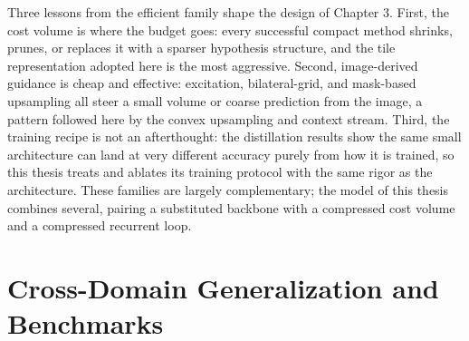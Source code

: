 Three lessons from the efficient family shape the design of Chapter 3.
First, the cost volume is where the budget goes: every successful
compact method shrinks, prunes, or replaces it with a sparser hypothesis
structure, and the tile representation adopted here is the most
aggressive. Second, image-derived guidance is cheap and effective:
excitation, bilateral-grid, and mask-based upsampling all steer a small
volume or coarse prediction from the image, a pattern followed here by
the convex upsampling and context stream. Third, the training recipe is
not an afterthought: the distillation results show the same small
architecture can land at very different accuracy purely from how it is
trained, so this thesis treats and ablates its training protocol with
the same rigor as the architecture. These families are largely
complementary; the model of this thesis combines several, pairing a
substituted backbone with a compressed cost volume and a compressed
recurrent loop.

\FloatBarrier
\section{Cross-Domain Generalization and Benchmarks}

